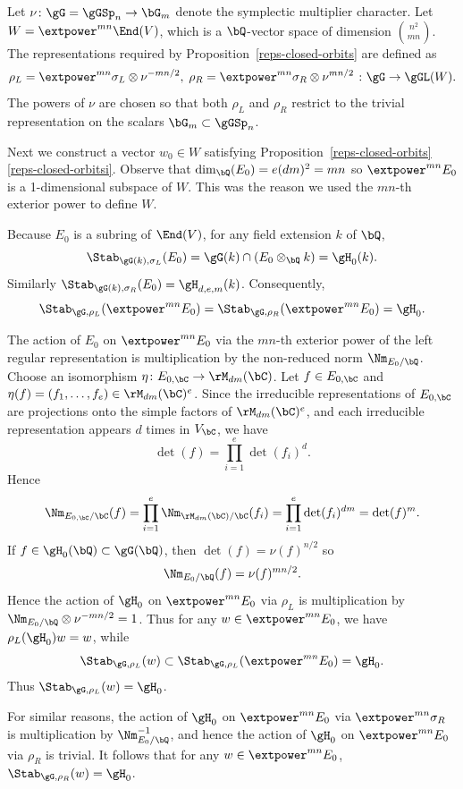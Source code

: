 Let $\nu \colon \gG = \gGSp_n \to \bG_m$ denote the symplectic multiplier character.
Let $W = \extpower^{mn} \End(V)$, which is a $\bQ$-vector space of dimension $\binom{n^2}{mn}$.
The representations required by Proposition~\ref{reps-closed-orbits} are defined as
\[
\rho_L = \extpower^{mn} \sigma_L \otimes \nu^{-mn/2}, \; \rho_R = \extpower^{mn} \sigma_R \otimes \nu^{mn/2} \; \colon \gG \to \gGL(W).
\]
The powers of $\nu$ are chosen so that both $\rho_L$ and $\rho_R$ restrict to the trivial representation on the scalars $\bG_m \subset \gGSp_n$.

Next we construct a vector $w_0 \in W$ satisfying Proposition~\ref{reps-closed-orbits}\eqref{reps-closed-orbitsi}.
Observe that $\dim_\bQ(E_0) = e(dm)^2 = mn$ so $\extpower^{mn} E_0$ is a 1-dimensional subspace of $W$.
This was the reason we used the $mn$-th exterior power to define $W$.

Because $E_0$ is a subring of $\End(V)$,
for any field extension $k$ of $\bQ$,
\[
\Stab_{\gG(k),\sigma_L}(E_0) = \gG(k) \cap (E_0 \otimes_\bQ k) = \gH_0(k).
\]
Similarly $\Stab_{\gG(k),\sigma_R}(E_0) = \gH_{d,e,m}(k)$.
Consequently,
\[
\Stab_{\gG,\rho_L}(\extpower^{mn} E_0) = \Stab_{\gG,\rho_R}(\extpower^{mn} E_0) = \gH_0.
\]

The action of $E_0$ on $\extpower^{mn} E_0$ via the $mn$-th exterior power of the left regular representation is multiplication by the non-reduced norm $\Nm_{E_0/\bQ}$.
Choose an isomorphism $\eta \colon E_{0,\bC} \to \rM_{dm}(\bC)$.
Let $f \in E_{0,\bC}$ and $\eta(f) = (f_1, \dotsc, f_e) \in \rM_{dm}(\bC)^e$.
Since the irre\-ducible representations of $E_{0,\bC}$ are projections onto the simple factors of $\rM_{dm}(\bC)^e$, and each irreducible representation appears $d$ times in $V_\bC$, we have
\[
\det(f) = \prod_{i=1}^e \det(f_i)^d.
\]
Hence
\[
\Nm_{E_{0,\bC}/\bC}(f) = \prod_{i=1}^e \Nm_{\rM_{dm}(\bC)/\bC}(f_i) = \prod_{i=1}^e \det(f_i)^{dm} = \det(f)^m.
\]
If $f \in \gH_0(\bQ) \subset \gG(\bQ)$, then $\det(f) = \nu(f)^{n/2}$ so
\[
\Nm_{E_0/\bQ}(f) = \nu(f)^{mn/2}.
\]
Hence the action of $\gH_0$ on $\extpower^{mn} E_0$ via $\rho_L$ is multiplication by $\Nm_{E_0/\bQ} \otimes \nu^{-mn/2} = 1$.
Thus for any $w \in \extpower^{mn} E_0$, we have $\rho_L(\gH_0)w = w$, while
\[
\Stab_{\gG,\rho_L}(w) \subset \Stab_{\gG,\rho_L}(\extpower^{mn} E_0) = \gH_0.
\]
Thus $\Stab_{\gG,\rho_L}(w) = \gH_0$.

For similar reasons, the action of $\gH_0$ on $\extpower^{mn} E_0$ via $\extpower^{mn} \sigma_R$ is multiplication by $\Nm_{E_0/\bQ}^{-1}$, and hence the action of $\gH_0$ on $\extpower^{mn} E_0$ via $\rho_R$ is trivial.
It follows that for any $w \in \extpower^{mn} E_0$, $\Stab_{\gG,\rho_R}(w) = \gH_0$.


